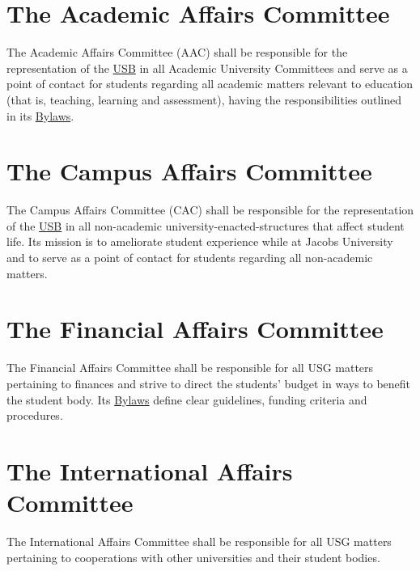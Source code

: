 \section{The Academic Affairs Committee}
\label{AACdef}
The Academic Affairs Committee (AAC) shall be responsible for the representation of the \hyperref[studentbody]{USB} in all Academic University Committees and serve as a point of contact for students regarding all academic matters relevant to education (that is, teaching, learning and assessment), having the responsibilities outlined in its  \hyperref[AACByLawsdef]{Bylaws}.


\section{The Campus Affairs Committee} 
\label{CACdef}
The Campus Affairs Committee (CAC) shall be responsible for the representation of the \hyperref[studentbody]{USB} in all non-academic university-enacted-structures that affect student life. Its mission is to ameliorate student experience while at Jacobs University and to serve as a point of contact for students regarding all non-academic matters.

\section{The Financial Affairs Committee}
\label{Financesdef}
The Financial Affairs Committee shall be responsible for all USG matters pertaining to finances and strive to direct the students' budget in ways to benefit the student body. Its \hyperref[FinByLawsdef]{Bylaws} define clear guidelines, funding criteria and procedures.

\section{The International Affairs Committee}
\label{IACdef}
The International Affairs Committee shall be responsible for all USG matters pertaining to cooperations with other universities and their student bodies. 